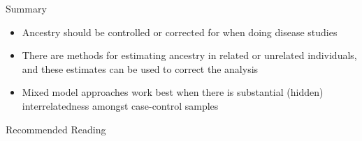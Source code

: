 \documentclass[serif,professionalfonts,svgnames]{beamer}
\begin{document}
\begin{frame}{Summary}
  \begin{itemize}
  \item Ancestry should be controlled or corrected for when doing
    disease studies
  \item There are methods for estimating ancestry in related or
    unrelated individuals, and these estimates can be used to correct
    the analysis
  \item Mixed model approaches work best when there is substantial
    (hidden) interrelatedness amongst case-control samples
 \end{itemize}
\end{frame}


\begin{frame}{Recommended Reading}
  \nocite{*}
  {}
  
\end{frame}
\end{document}
